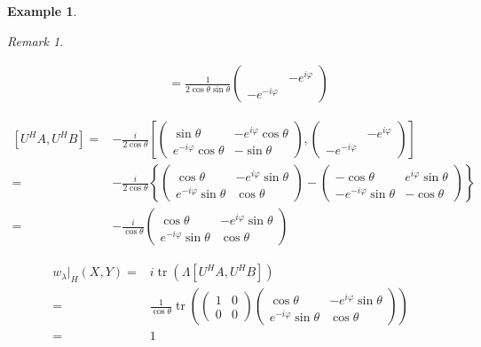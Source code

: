 \documentclass[11pt]{amsart}
\numberwithin{equation}{section}
\theoremstyle{plain}
\newtheorem{eg}[theorem]{Example}
\theoremstyle{plain}
\numberwithin{equation}{section}
\theoremstyle{remark}
\newtheorem{remark}[theorem]{Remark}
\DeclareMathOperator{\tr}{tr}
\begin{document}
\begin{eg}
\begin{remark}
\begin{list}{}
\begin{equation*}
\begin{aligned}
		&\phantom{U^HA}=
		\frac{1}{2 \cos \theta \sin \theta}
		\begin{pmatrix}
		&-e^{i\varphi}\\
		-e^{-i\varphi}&
		\end{pmatrix}
		\end{aligned}
		\end{equation*}
	\item 
		\begin{equation*}
		\begin{aligned}{}
			[U^HA,U^HB]=&-\frac{i}{2 \cos \theta}
			\left[
				\begin{pmatrix}
				\sin \theta & -e^{i\varphi} \cos \theta  \\
				e^{-i\varphi} \cos \theta  & -\sin \theta
				\end{pmatrix},
				\begin{pmatrix}
				&-e^{i\varphi}\\
				-e^{-i\varphi}&
				\end{pmatrix}
			\right]\\
			=& -\frac{i}{2 \cos \theta}
			\left\{
				\begin{pmatrix}
				\cos \theta & -e^{i\varphi} \sin \theta  \\
				e^{-i\varphi} \sin \theta  & \cos \theta
				\end{pmatrix}-
				\begin{pmatrix}
				-\cos \theta & e^{i\varphi} \sin \theta  \\
				-e^{-i\varphi} \sin \theta  & -\cos \theta
				\end{pmatrix}
			\right\}\\
			=& -\frac{i}{\cos \theta}
				\begin{pmatrix}
				\cos \theta & -e^{i\varphi} \sin \theta  \\
				e^{-i\varphi} \sin \theta  & \cos \theta
				\end{pmatrix}
		\end{aligned}
		\end{equation*}
	\item 
		\begin{equation*}
		\begin{aligned}
		w_\lambda \big|_H(X,Y)
			=&i\tr (\Lambda[U^HA,U^HB])\\
			=&\frac{1}{\cos \theta}\tr\left(
				\begin{pmatrix}
				1&0\\
				0&0
				\end{pmatrix}
				\begin{pmatrix}
				\cos \theta & -e^{i\varphi} \sin \theta  \\
				e^{-i\varphi} \sin \theta  & \cos \theta
				\end{pmatrix}				
			\right)\\
			=&1
		\end{aligned}
		\end{equation*}
\end{list}
	\end{remark}
\end{eg}
\end{document}
